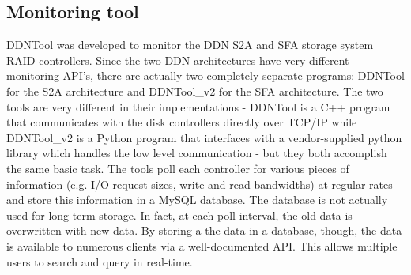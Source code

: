\subsection{Monitoring tool}

DDNTool \cite{ddntool10:ross} was developed to monitor the DDN S2A and SFA
storage system RAID controllers. Since the two DDN architectures have very
different monitoring API's, there are actually two completely separate
programs:  DDNTool for the S2A architecture and DDNTool\_v2 for the SFA
architecture.  The two tools are very different in their implementations -
DDNTool is a C++ program that communicates with the disk controllers directly
over TCP/IP while DDNTool\_v2 is a Python program that interfaces with a
vendor-supplied python library which handles the low level communication - but
they both accomplish the same basic task.  The tools poll each controller for
various pieces of information (e.g. I/O request sizes, write and read
bandwidths) at regular rates and store this information in a MySQL database.
The database is not actually used for long term storage.  In fact, at each poll
interval, the old data is overwritten with new data.  By storing a the data in
a database, though, the data is available to numerous clients via a
well-documented API.  This allows multiple users to search and query in
real-time.

